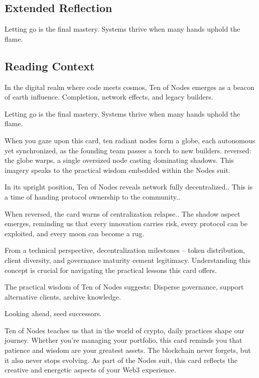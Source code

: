 \documentclass[11pt,oneside]{book}
\begin{document}
\begin{minipage}[t]{0.55\textwidth}
  \subsection*{Extended Reflection}
  Letting go is the final mastery. Systems thrive when many hands uphold the flame.

  \subsection*{Reading Context}
  In the digital realm where code meets cosmos, Ten of Nodes emerges as a beacon of earth influence. Completion, network effects, and legacy builders.

  Letting go is the final mastery. Systems thrive when many hands uphold the flame.

  When you gaze upon this card, ten radiant nodes form a globe, each autonomous yet synchronized, as the founding team passes a torch to new builders. reversed: the globe warps, a single oversized node casting dominating shadows. This imagery speaks to the practical wisdom embedded within the Nodes suit.

  In its upright position, Ten of Nodes reveals network fully decentralized.. This is a time of handing protocol ownership to the community..

  When reversed, the card warns of centralization relapse.. The shadow aspect emerges, reminding us that every innovation carries risk, every protocol can be exploited, and every moon can become a rug.

  From a technical perspective, decentralization milestones – token distribution, client diversity, and governance maturity cement legitimacy. Understanding this concept is crucial for navigating the practical lessons this card offers.

  The practical wisdom of Ten of Nodes suggests: Disperse governance, support alternative clients, archive knowledge.

  Looking ahead, seed successors.

  Ten of Nodes teaches us that in the world of crypto, daily practices shape our journey. Whether you're managing your portfolio, this card reminds you that patience and wisdom are your greatest assets. The blockchain never forgets, but it also never stops evolving. As part of the Nodes suit, this card reflects the creative and energetic aspects of your Web3 experience.

\end{minipage}
\end{document}
